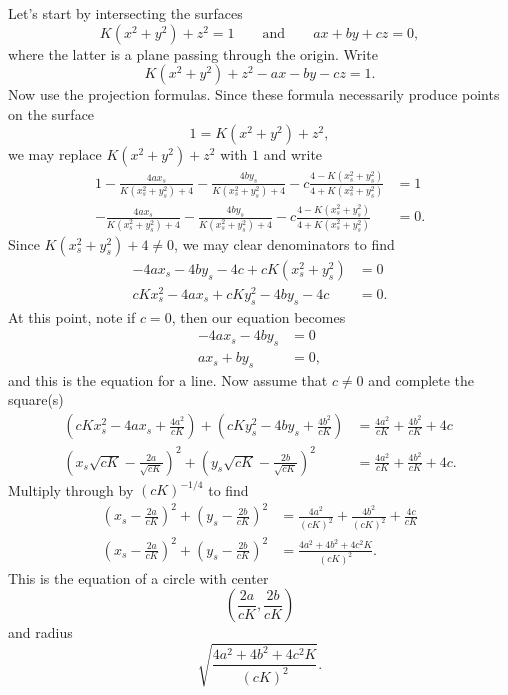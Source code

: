 \documentclass{ximera}
\begin{document}
\begin{problem}
\begin{freeResponse}
  Let's start by intersecting the surfaces
  \[
  K\left(x^2+y^2\right)+z^2=1\qquad\text{and}\qquad ax+by+cz=0,
  \]
  where the latter is a plane passing through the origin. Write
  \[
  K\left(x^2+y^2\right) + z^2- ax- by-cz=1.
  \]
  Now use the projection formulas. Since these formula necessarily
  produce points on the surface
  \[
  1 = K\left(x^2+y^2\right) + z^2,
  \]
  we may replace $K\left(x^2+y^2\right) + z^2$ with $1$ and write
\begin{align*}
1-\frac{4ax_s}{K\left(x_s^2 + y_s^2\right) + 4}- \frac{4by_s}{K\left(x_s^2 + y_s^2\right) + 4}-c\frac{4-K\left(x_s^2 + y_s^2\right)}{4+K\left(x_s^2 + y_s^2\right)}&=1\\
 -\frac{4ax_s}{K\left(x_s^2 + y_s^2\right) + 4}- \frac{4by_s}{K\left(x_s^2 + y_s^2\right) + 4}-c\frac{4-K\left(x_s^2 + y_s^2\right)}{4+K\left(x_s^2 + y_s^2\right)}&=0.
\end{align*}
Since $K\left(x_s^2 + y_s^2\right) + 4 \ne 0$, we may clear
denominators to find 
  \begin{align*}
    -4ax_s-4by_s-4c + cK\left(x_s^2+y_s^2\right) &= 0\\
    cKx_s^2-4ax_s + cKy_s^2-4by_s-4c &= 0.
  \end{align*}
  At this point, note if $c=0$, then our equation becomes
  \begin{align*}
    -4ax_s -4by_s &= 0\\
    ax_s + by_s &= 0,
  \end{align*}
  and this is the equation for a line. Now assume that $c\ne 0$ and
  complete the square(s)
  \begin{align*}
  \left(cKx_s^2 - 4ax_s + \frac{4a^2}{cK}\right) + \left(cKy_s^2 - 4by_s + \frac{4b^2}{cK}\right) &=
  \frac{4a^2}{cK} + \frac{4b^2}{cK} + 4c\\
  \left(x_s\sqrt{cK} - \frac{2a}{\sqrt{cK}}\right)^2 + \left(y_s\sqrt{cK} - \frac{2b}{\sqrt{cK}}\right)^2&=\frac{4a^2}{cK} + \frac{4b^2}{cK} + 4c.
  \end{align*}
  Multiply through by $(cK)^{-1/4}$ to find
  \begin{align*}
    \left(x_s - \frac{2a}{cK}\right)^2 + \left(y_s - \frac{2b}{cK}\right)^2 &= \frac{4a^2}{(cK)^2} + \frac{4b^2}{(cK)^2} + \frac{4c}{cK}\\
    \left(x_s - \frac{2a}{cK}\right)^2 + \left(y_s - \frac{2b}{cK}\right)^2 &= \frac{4a^2 + 4b^2 + 4c^2K}{(cK)^2}.
  \end{align*}
  This is the equation of a circle with center
  \[
  \left(\frac{2a}{cK}, \frac{2b}{cK}\right)
  \]
  and radius
  \[
  \sqrt{\frac{4a^2 + 4b^2 + 4c^2K}{(cK)^2}}.
  \]
\end{freeResponse}
\end{problem}
\end{document}
